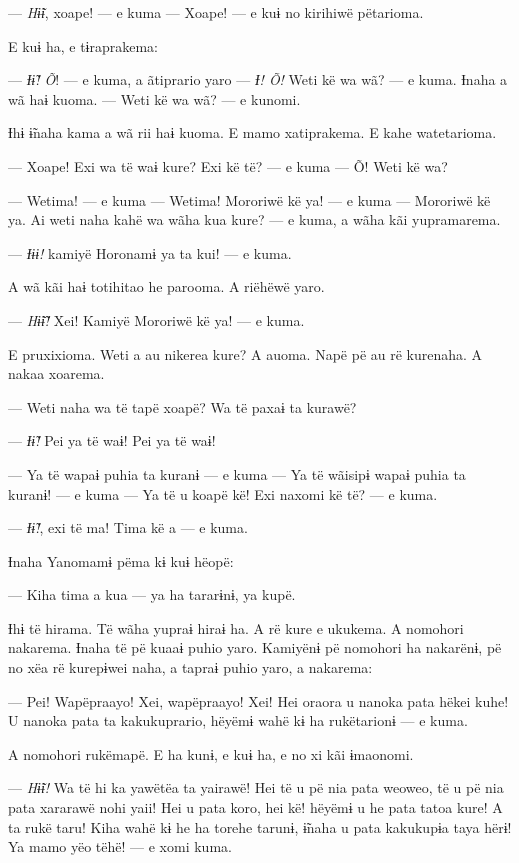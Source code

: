 --- \textit{Hɨ̃ɨ}, xoape! --- e kuma --- Xoape! --- e kuɨ no kirihiwë pëtarioma. 

E kuɨ ha, e tɨraprakema: 

--- \textit{Ɨɨ̃! Õ}! --- e kuma, a ãtiprario yaro --- \textit{Ɨ! Õ!} Weti kë wa wã? --- e
kuma. Ɨnaha a wã haɨ kuoma. --- Weti kë wa wã? --- e kunomi. 

Ɨhɨ ɨ̃naha kama a wã rii haɨ kuoma. E mamo xatiprakema. E kahe
watetarioma. 

--- Xoape! Exi wa të waɨ kure? Exi kë të? --- e kuma --- Õ! Weti kë wa?

--- Wetima! --- e kuma --- Wetima! Mororiwë kë ya! --- e kuma --- Mororiwë kë
ya. Ai weti naha kahë wa wãha kua kure? --- e kuma, a wãha kãi
yupramarema. 

--- \textit{Ɨɨɨ!} kamiyë Horonamɨ ya ta kui! --- e kuma. 

A wã kãi haɨ totihitao he parooma. A riëhëwë yaro. 

--- \textit{Hɨ̃ɨ̃!} Xei! Kamiyë Mororiwë kë ya! --- e kuma. 

E pruxixioma. Weti a au nikerea kure? A auoma. Napë pë au rë kurenaha. A nakaa xoarema. 

--- Weti naha wa të tapë xoapë? Wa të paxaɨ ta kurawë? 

--- \textit{Ɨɨ̃!} Pei ya të waɨ! Pei ya të waɨ! 

--- Ya të wapaɨ puhia ta kuranɨ --- e kuma --- Ya të wãisipɨ wapaɨ puhia ta
kuranɨ! --- e kuma --- Ya të u koapë kë! Exi naxomi kë të? --- e kuma. 

--- \textit{Ɨɨ̃!}, exi të ma! Tima kë a --- e kuma. 

Ɨnaha Yanomamɨ pëma kɨ kuɨ hëopë: 

--- Kiha tima a kua --- ya ha tararɨnɨ, ya kupë. 

Ɨhɨ të hirama. Të wãha yupraɨ hiraɨ ha. A rë kure e ukukema. A nomohori
 nakarema. Ɨnaha të pë kuaaɨ puhio yaro. Kamiyënɨ pë nomohori ha
 nakarënɨ, pë no xëa rë kurepɨwei naha, a tapraɨ puhio yaro, a nakarema: 

--- Pei! Wapëpraayo! Xei, wapëpraayo! Xei! Hei oraora u nanoka pata hëkei
kuhe! U nanoka pata ta kakukuprario, hëyëmɨ wahë kɨ ha rukëtarionɨ --- e
kuma. 

A nomohori rukëmapë. E ha kunɨ, e kuɨ ha, e no xi kãi ɨmaonomi. 

--- \textit{Hɨ̃ɨ!} Wa të hi ka yawëtëa ta yairawë! Hei të u pë nia pata weoweo, të u
 pë nia pata xararawë nohi yaii! Hei u pata koro, hei kë! hëyëmɨ u he
 pata tatoa kure! A ta rukë taru! Kiha wahë kɨ he ha torehe tarunɨ, ɨ̃naha
 u pata kakukupɨa taya hërɨ! Ya mamo yëo tëhë! --- e xomi kuma. 

